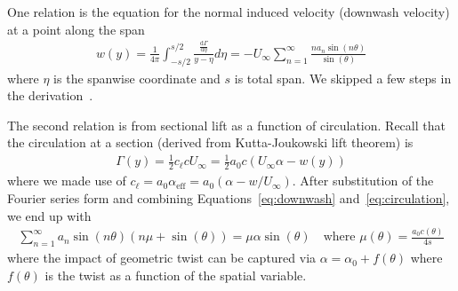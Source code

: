\documentclass[10pt]{article}
\newcommand{\dd}[2]{\frac{\textrm{d} #1}{\textrm{d} #2}}
\newcommand{\half}{\frac{1}{2}}
\newcommand{\be}{\begin{eqnarray}}
\newcommand{\ee}{\end{eqnarray}}
\newcommand{\Uinf}{U_{\infty}}
\newcommand{\tn}[1]{\textrm{#1}}
\begin{document}
One relation is the equation for the normal induced velocity (downwash velocity) at a point along the span
\be
\label{eq:downwash}
w(y) = \frac{1}{4\pi}
\int_{-s/2}^{s/2} \frac{\dd{\Gamma}{\eta} }{y - \eta} d\eta
=
\boxed{
    -\Uinf \sum_{n=1}^{\infty} \frac{n a_n \sin \left( n \theta \right)}{\sin(\theta)}
}
\ee
where $\eta$ is the spanwise coordinate and $s$ is total span.
We skipped a few steps in the derivation~\cite[Sec.~3.7]{Kerwin2010}.

The second relation is from sectional lift as a function of circulation.
Recall that the circulation at a section (derived from Kutta-Joukowski lift theorem) is
\be
\label{eq:circulation}
\Gamma(y) = \half c_\ell c \Uinf
=\half a_0 c \left(\Uinf \alpha - w(y)\right)
\ee
where we made use of $c_\ell = a_0 \alpha_{\tn{eff}} = a_0 \left(\alpha - w/\Uinf\right)$.
After substitution of the Fourier series form and combining Equations~\eqref{eq:downwash} and~\eqref{eq:circulation}, we end up with
\be
\label{eq:circulation2}
\sum_{n=1}^{\infty} a_n \sin(n\theta) \left(n\mu + \sin(\theta)\right)
=
\mu \alpha \sin(\theta)
\quad \tn{where }\mu(\theta) = \frac{a_0 c(\theta)}{ 4 s}
\ee
where the impact of geometric twist can be captured via $\alpha = \alpha_0 + f(\theta)$ where $f(\theta)$ is the twist as a function of the spatial variable.
\end{document}
